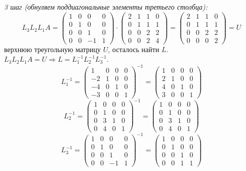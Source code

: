 \documentclass[9pt]{article}
\begin{document}
\par\textit{3 шаг (обнуляем поддиагональные элементы третьего столбца):}
\[L_3L_2L_1A=\left(
\begin{array}{cccc}
    1 & 0 & 0 & 0\\
    0 & 1 & 0 & 0\\
    0 & 0 & 1 & 0\\
    0 & 0 & -1 & 1
\end{array}
\right)\cdot\left(
\begin{array}{cccc}
    2 & 1 & 1 & 0\\
    0 & 1 & 1 & 1\\
    0 & 0 & 2 & 2\\
    0 & 0 & 2 & 4
\end{array}
\right)=\left(
\begin{array}{cccc}
    2 & 1 & 1 & 0\\
    0 & 1 & 1 & 1\\
    0 & 0 & 2 & 2\\
    0 & 0 & 0 & 2
\end{array}
\right)=U\]
 верхнюю треугольную матрицу \(U\), осталось найти \(L\). \(L_3L_2L_1A=U \Rightarrow L=L_1^{-1}L_2^{-1}L_3^{-1}\).
\[L_1^{-1}=\left(
\begin{array}{cccc}
    1 & 0 & 0 & 0\\
    -2 & 1 & 0 & 0\\
    -4 & 0 & 1 & 0\\
    -3 & 0 & 0 & 1
\end{array}
\right)^{-1}=\left(
\begin{array}{cccc}
    1 & 0 & 0 & 0\\
    2 & 1 & 0 & 0\\
    4 & 0 & 1 & 0\\
    3 & 0 & 0 & 1
\end{array}
\right)\]
\[L_2^{-1}=\left(
\begin{array}{cccc}
    1 & 0 & 0 & 0\\
    0 & 1 & 0 & 0\\
    0 & 3 & 1 & 0\\
    0 & 4 & 0 & 1
\end{array}
\right)^{-1}=\left(
\begin{array}{cccc}
    1 & 0 & 0 & 0\\
    0 & 1 & 0 & 0\\
    0 & 3 & 1 & 0\\
    0 & 4 & 0 & 1
\end{array}
\right)\]
\[L_3^{-1}=\left(
\begin{array}{cccc}
    1 & 0 & 0 & 0\\
    0 & 1 & 0 & 0\\
    0 & 0 & 1 & 0\\
    0 & 0 & -1 & 1
\end{array}
\right)^{-1}=\left(
\begin{array}{cccc}
    1 & 0 & 0 & 0\\
    0 & 1 & 0 & 0\\
    0 & 0 & 1 & 0\\
    0 & 0 & 1 & 1
\end{array}
\right)\]
\end{document}
